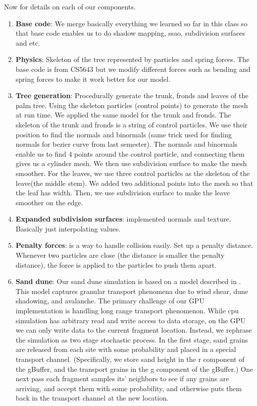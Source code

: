 \documentclass[annual]{acmsiggraph}
\begin{document}
Now for details on each of our components.
\begin{enumerate}
\item{\textbf{Base code}: We merge basically everything we learned so far in this class so that base code enables us to do shadow mapping, ssao, subdivision surfaces and etc.}
\item{\textbf{Physics}: Skeleton of the tree represented by particles and spring forces. The base code is from CS5643 but we modify different forces such as bending and spring forces to make it work better for our model.}
\item{\textbf{Tree generation}: Procedurally generate the trunk, fronds and leaves of the palm tree. Using the skeleton particles (control points) to generate the mesh at run time. We applied the same model for the trunk and fronds. The skeleton of the trunk and fronds is a string of control particles. We use their position to find the normals and binormals (same trick used for finding normals for bezier curve from last semester). The normals and binormals enable us to find 4 points around the control particle, and connecting them gives us a cylinder mesh. We then use subdivision surface to make the mesh smoother. For the leaves, we use three control particles as the skeleton of the leave(the middle stem). We added two additional points into the mesh so that the leaf has width. Then, we use subdivision surface to make the leave smoother on the edge.}
\item{\textbf{Expanded subdivision surfaces}: implemented normals and texture. Basically just interpolating values.}
\item{\textbf{Penalty forces}: is a way to handle collision easily. Set up a penalty distance. Whenever two particles are close (the distance is smaller the penalty distance), the force is applied to the particles to push them apart.}
\item{\textbf{Sand dune}: Our sand dune simulation is based on a model described in  \cite{momiji2002}.  This model captures granular transport phenomena due to wind shear, dune shadowing, and avalanche.  The primary challenge of our GPU implementation is handling long range transport phenomenon.  While cpu simulation has arbitrary read and write access to  data storage, on the GPU we can only write data to the current fragment location.  Instead, we rephrase the simulation as two stage stochastic process.  In the first stage, sand grains are released from each site with some probability  and placed in a special transport channel.  (Specifically, we store sand height in the r component of the gBuffer, and the transport grains in the g component of the gBuffer.)  One next pass each fragment samples its' neighbors to see if any grains are arriving, and accept them with some probability, and otherwise puts them back in the transport channel at the new location.    }

\end{enumerate}
\end{document}
